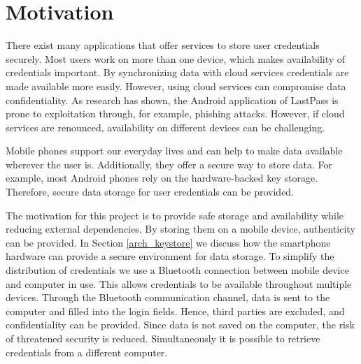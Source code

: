\section{Motivation} \label{motivation}
There exist many applications that offer services to store user credentials securely. Most users work on more than one device, which makes availability of credentials important.
By synchronizing data with cloud services credentials are made available more easily. However, using cloud services can compromise data confidentiality. As research \cite{AndroidPhishing} has shown, the Android application of LastPass is prone to exploitation through, for example, phishing attacks.  However, if cloud services are renounced, availability on different devices can be challenging.

Mobile phones support our everyday lives and can help to make data available wherever the user is. Additionally, they offer a secure way to store data. For example, most Android phones rely on the hardware-backed key storage. Therefore, secure data storage for user credentials can be provided. 

The motivation for this project is to provide safe storage and availability while reducing external dependencies. By storing them on a mobile device, authenticity can be provided. In Section \ref{arch_keystore} we discuss how the smartphone hardware can provide a secure environment for data storage. To simplify the distribution of credentials we use a Bluetooth connection between mobile device and computer in use. This allows credentials to be available throughout multiple devices. Through the Bluetooth communication channel, data is sent to the computer and filled into the login fields. Hence, third parties are excluded, and confidentiality can be provided. Since data is not saved on the computer, the risk of threatened security is reduced. Simultaneously it is possible to retrieve credentials from a different computer. 

